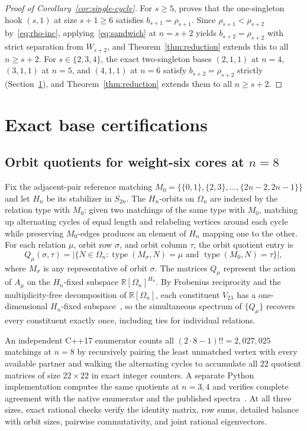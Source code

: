 \documentclass[11pt]{article}
\theoremstyle{remark}
\newcommand{\R}{\mathbb{R}}
\DeclareMathOperator{\type}{type}
\begin{document}
\begin{proof}[Proof of Corollary~\ref{cor:single-cycle}]
For $s \ge 5$, \cite[Corollary~3.5]{GuptaEtAl} proves that the one-singleton
hook $(s, 1)$ at size $s + 1 \ge 6$ satisfies $b_{s+1} = \rho_{s+1}$. Since
$\rho_{s+1} < \rho_{s+2}$ by~\eqref{eq:rho-inc}, applying~\eqref{eq:sandwich}
at $n = s + 2$ yields $b_{s+2} = \rho_{s+2}$ with strict separation from
$W_{s+2}$, and Theorem~\ref{thm:reduction} extends this to all $n \ge s + 2$.
For $s \in \{2, 3, 4\}$, the exact two-singleton bases $(2,1,1)$ at $n=4$,
$(3,1,1)$ at $n=5$, and $(4,1,1)$ at $n=6$ satisfy $b_{s+2} = \rho_{s+2}$
strictly (Section~\ref{sec:bases}), and Theorem~\ref{thm:reduction} extends
them to all $n \ge s+2$.
\end{proof}

\section{Exact base certifications}\label{sec:bases}

\subsection{Orbit quotients for weight-six cores at \texorpdfstring{$n = 8$}{n = 8}}

Fix the adjacent-pair reference matching
$M_0 = \{\{0,1\}, \{2,3\}, \dots, \{2n-2, 2n-1\}\}$ and let $H_n$ be its
stabilizer in $S_{2n}$. The $H_n$-orbits on $\Omega_n$ are indexed by the
relation type with $M_0$: given two matchings of the same type with $M_0$,
matching up alternating cycles of equal length and relabeling vertices around
each cycle while preserving $M_0$-edges produces an element of $H_n$ mapping
one to the other. For each relation $\mu$, orbit row $\sigma$, and orbit column
$\tau$, the orbit quotient entry is
\[
  Q_\mu(\sigma, \tau)
  = \bigl|\{N \in \Omega_n : \type(M_\sigma, N) = \mu
    \text{ and } \type(M_0, N) = \tau\}\bigr|,
\]
where $M_\sigma$ is any representative of orbit $\sigma$. The matrices $Q_\mu$
represent the action of $A_\mu$ on the $H_n$-fixed subspace
$\R[\Omega_n]^{H_n}$. By Frobenius reciprocity and the multiplicity-free
decomposition of $\R[\Omega_n]$, each constituent $V_{2\lambda}$ has a
one-dimensional $H_n$-fixed subspace~\cite{Srinivasan}, so the simultaneous
spectrum of $\{Q_\mu\}$ recovers every constituent exactly once, including ties
for individual relations.

An independent C++17 enumerator counts all $(2\cdot 8 - 1)!! = 2{,}027{,}025$
matchings at $n = 8$ by recursively pairing the least unmatched vertex with
every available partner and walking the alternating cycles to accumulate all
$22$ quotient matrices of size $22 \times 22$ in exact integer counters. A
separate Python implementation computes the same quotients at $n = 3, 4$ and
verifies complete agreement with the native enumerator and the published
spectra~\cite[Appendix~A, Tables~4--5]{GuptaEtAl}. At all three sizes, exact
rational checks verify the identity matrix, row sums, detailed balance with
orbit sizes, pairwise commutativity, and joint rational eigenvectors.
\end{document}
